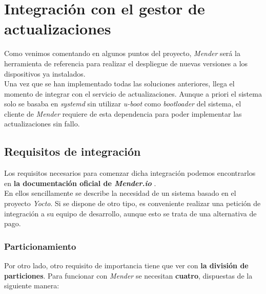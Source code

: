 \section{Integración con el gestor de actualizaciones}

Como venimos comentando en algunos puntos del proyecto, \textit{Mender} será la herramienta de referencia para realizar el despliegue de nuevas versiones a los dispositivos ya instalados.\\

Una vez que se han implementado todas las soluciones anteriores, llega el momento de integrar con el servicio de actualizaciones. Aunque a priori el sistema solo se basaba en \textit{systemd} sin utilizar \textit{u-boot} como \textit{bootloader} del sistema, el cliente de \textit{Mender} requiere de esta dependencia para poder implementar las actualizaciones sin fallo.\\

\subsection{Requisitos de integración}

Los requisitos necesarios para comenzar dicha integración podemos encontrarlos en \textbf{la documentación oficial de \textit{Mender.io}} \cite{mender-requirements}.\\

En ellos sencillamente se describe la necesidad de un sistema basado en el proyecto \textit{Yocto}. Si se dispone de otro tipo, es conveniente realizar una petición de integración a su equipo de desarrollo, aunque esto se trata de una alternativa de pago.\\

\subsubsection{Particionamiento}

Por otro lado, otro requisito de importancia tiene que ver con \textbf{la división de particiones}. Para funcionar con \textit{Mender} se necesitan \textbf{cuatro}, dispuestas de la siguiente manera:

